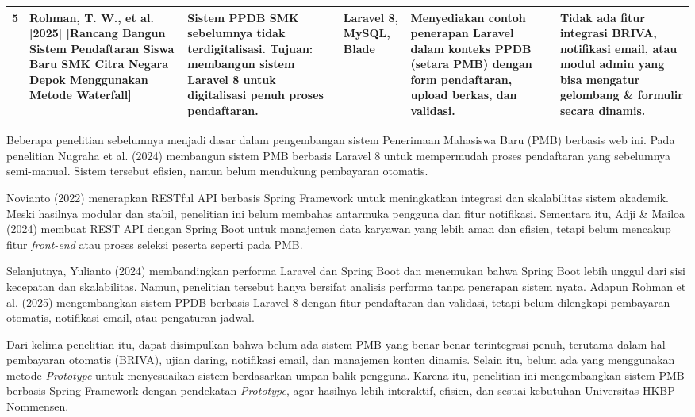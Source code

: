 \begin{longtable}{|b{}|p{}|p{}|p{}|p{}|p{}|}
	\hline
	5 & Rohman, T. W., et al. [2025] [Rancang Bangun Sistem Pendaftaran Siswa Baru SMK Citra Negara Depok Menggunakan Metode Waterfall] \cite{rohman2025rancang} & Sistem PPDB SMK sebelumnya tidak terdigitalisasi. Tujuan: membangun sistem Laravel 8 untuk digitalisasi penuh proses pendaftaran. & Laravel 8, MySQL, Blade & Menyediakan contoh penerapan Laravel dalam konteks PPDB (setara PMB) dengan form pendaftaran, upload berkas, dan validasi. & Tidak ada fitur integrasi BRIVA, notifikasi email, atau modul admin yang bisa mengatur gelombang \& formulir secara dinamis. \\
	\hline
\end{longtable}

Beberapa penelitian sebelumnya menjadi dasar dalam pengembangan sistem Penerimaan Mahasiswa Baru (PMB) berbasis web ini. Pada penelitian Nugraha et al. (2024) membangun sistem PMB berbasis Laravel 8 untuk mempermudah proses pendaftaran yang sebelumnya semi-manual. Sistem tersebut efisien, namun belum mendukung pembayaran otomatis.\par

Novianto (2022) menerapkan RESTful API berbasis Spring Framework untuk meningkatkan integrasi dan skalabilitas sistem akademik. Meski hasilnya modular dan stabil, penelitian ini belum membahas antarmuka pengguna dan fitur notifikasi. Sementara itu, Adji \& Mailoa (2024) membuat REST API dengan Spring Boot untuk manajemen data karyawan yang lebih aman dan efisien, tetapi belum mencakup fitur \textit{front-end} atau proses seleksi peserta seperti pada PMB.\par

Selanjutnya, Yulianto (2024) membandingkan performa Laravel dan Spring Boot dan menemukan bahwa Spring Boot lebih unggul dari sisi kecepatan dan skalabilitas. Namun, penelitian tersebut hanya bersifat analisis performa tanpa penerapan sistem nyata. Adapun Rohman et al. (2025) mengembangkan sistem PPDB berbasis Laravel 8 dengan fitur pendaftaran dan validasi, tetapi belum dilengkapi pembayaran otomatis, notifikasi email, atau pengaturan jadwal.\par

Dari kelima penelitian itu, dapat disimpulkan bahwa belum ada sistem PMB yang benar-benar terintegrasi penuh, terutama dalam hal pembayaran otomatis (BRIVA), ujian daring, notifikasi email, dan manajemen konten dinamis. Selain itu, belum ada yang menggunakan metode \textit{Prototype} untuk menyesuaikan sistem berdasarkan umpan balik pengguna. Karena itu, penelitian ini mengembangkan sistem PMB berbasis Spring Framework dengan pendekatan \textit{Prototype}, agar hasilnya lebih interaktif, efisien, dan sesuai kebutuhan Universitas HKBP Nommensen.\par

